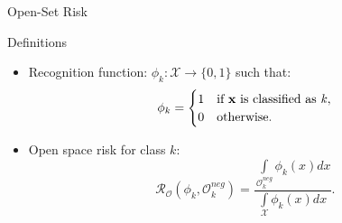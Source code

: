 \begin{frame}{Open-Set Risk}
    \begin{definitionblock}{Definitions}
        \begin{itemize}
            \item <1-> Recognition function: 
            $\phi_k: \mathcal{X} \to \{0,1\}$ such that:
            \[
                \phi_k = \begin{cases}
                1 & \text{if $\mathbf{x}$ is classified as \emph{k}}, \\
                0 & \text{otherwise}.
                \end{cases}
            \]
            \item <2-> Open space risk for class $k$:
            \[
                \mathcal{R}_{\mathcal{O}}(\phi_k, \mathcal{O}^{neg}_k) = \frac{\int \limits_{\mathcal{O}^{neg}_k} \phi_k(x)dx}{\int \limits_{\mathcal{X}} \phi_k(x)dx}.
            \]
        \end{itemize}
    \end{definitionblock}
\end{frame}